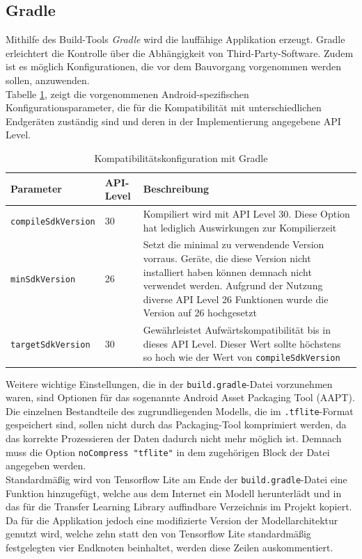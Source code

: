 \documentclass[oneside]{ausarbeitung}
\begin{document}
\subsection{Gradle}
Mithilfe des Build-Tools \textit{Gradle} wird die lauffähige Applikation erzeugt. Gradle erleichtert die Kontrolle über die Abhängigkeit von Third-Party-Software. Zudem ist es möglich Konfigurationen, die vor dem Bauvorgang vorgenommen werden sollen, anzuwenden.\\
Tabelle \ref{tab:gradle-config}, zeigt die vorgenommenen Android-spezifischen Konfigurationsparameter, die für die Kompatibilität mit unterschiedlichen Endgeräten zuständig sind und deren in der Implementierung angegebene API Level.\\
\begin{table}[htbp]
	\centering
	\begin{tabular}{|l|p{1cm}|p{8.5cm}|}
		\hline
		\textbf{Parameter} & \textbf{API-Level} & \textbf{Beschreibung} \\ \hline
		\texttt{compileSdkVersion} & 30 & Kompiliert wird mit API Level 30. Diese Option hat lediglich Auswirkungen zur Kompilierzeit  \\ \hline
		\texttt{minSdkVersion} & 26 & Setzt die minimal zu verwendende Version vorraus. Geräte, die diese Version nicht installiert haben können demnach nicht verwendet werden. Aufgrund der Nutzung diverse API Level 26 Funktionen wurde die Version auf 26 hochgesetzt \\ \hline
		\texttt{targetSdkVersion} & 30 & Gewährleistet Aufwärtskompatibilität bis in dieses API Level. Dieser Wert sollte höchstens so hoch wie der Wert von \texttt{compileSdkVersion}  \\ \hline
	\end{tabular}
	\caption{Kompatibilitätskonfiguration mit Gradle}
	\label{tab:gradle-config}
\end{table}Weitere wichtige Einstellungen, die in der \texttt{build.gradle}-Datei vorzunehmen waren, sind Optionen für das sogenannte Android Asset Packaging Tool (AAPT). Die einzelnen Bestandteile des zugrundliegenden Modells, die im \texttt{.tflite}-Format gespeichert sind, sollen nicht durch das Packaging-Tool komprimiert werden, da das korrekte Prozessieren der Daten dadurch nicht mehr möglich ist. Demnach muss die Option \texttt{noCompress "tflite"} in dem zugehörigen Block der Datei angegeben werden.\\ 
Standardmäßig wird von Tensorflow Lite am Ende der \texttt{build.gradle}-Datei eine Funktion hinzugefügt, welche aus dem Internet ein Modell herunterlädt und in das für die Transfer Learning Library auffindbare Verzeichnis im Projekt kopiert.\\
Da für die Applikation jedoch eine modifizierte Version der Modellarchitektur genutzt wird, welche zehn statt den von Tensorflow Lite standardmäßig festgelegten vier Endknoten beinhaltet, werden diese Zeilen auskommentiert.
\end{document}
